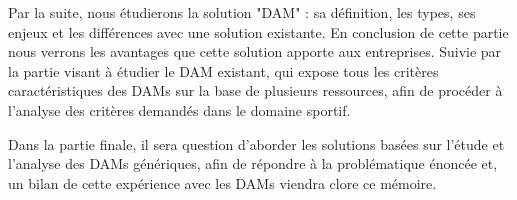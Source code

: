 \documentclass[a4paper, 12pt]{report}
\begin{document}
Par la suite, nous étudierons la solution "DAM" : sa définition, les types, ses enjeux et les différences avec une solution existante. En conclusion de cette partie nous verrons les avantages que cette solution apporte aux entreprises. 
Suivie par la partie visant à étudier le DAM existant, qui expose tous les critères caractéristiques des DAMs sur la base de plusieurs ressources, afin de procéder à l’analyse des critères demandés dans le domaine sportif.
\newline

Dans la partie finale, il sera question d'aborder les solutions basées sur l’étude et l’analyse des DAMs génériques, afin de répondre à la problématique énoncée et, un bilan de cette expérience avec les DAMs viendra clore ce mémoire.





\end{document}
